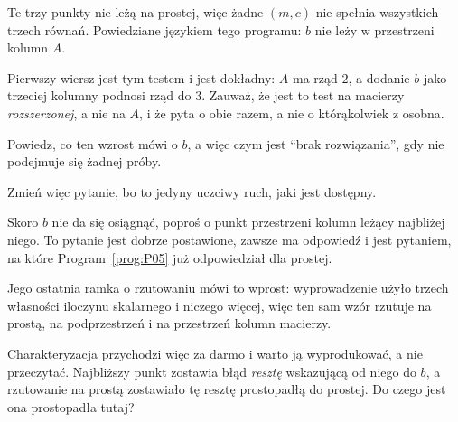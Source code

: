 \begin{fr}
Te trzy punkty nie leżą na prostej, więc żadne $(m, c)$ nie spełnia wszystkich
trzech równań. Powiedziane językiem tego programu: $b$ nie leży w przestrzeni
kolumn $A$.


Pierwszy wiersz jest tym testem i jest dokładny: $A$ ma rząd $2$, a dodanie $b$
jako trzeciej kolumny podnosi rząd do $3$. Zauważ, że jest to test na macierzy
\emph{rozszerzonej}, a nie na $A$, i że pyta o obie razem, a nie o którąkolwiek
z osobna.

Powiedz, co ten wzrost mówi o $b$, a więc czym jest \enquote{brak rozwiązania},
gdy nie podejmuje się żadnej próby.
\dotline
\nextframe
\end{fr}

\begin{fr}
Zmień więc pytanie, bo to jedyny uczciwy ruch, jaki jest dostępny.

Skoro $b$ nie da się osiągnąć, poproś o punkt przestrzeni kolumn leżący
najbliżej niego. To pytanie jest dobrze postawione, zawsze ma odpowiedź i jest
pytaniem, na które Program~\ref{prog:P05} już odpowiedział \dash{} dla prostej.

Jego ostatnia ramka o rzutowaniu mówi to wprost: wyprowadzenie użyło trzech
własności iloczynu skalarnego i niczego więcej, więc ten sam wzór rzutuje na
prostą, na podprzestrzeń i na przestrzeń kolumn macierzy.

Charakteryzacja przychodzi więc za darmo i warto ją wyprodukować, a nie
przeczytać. Najbliższy punkt zostawia błąd \dash{} \emph{resztę} \dash{}
wskazującą od niego do $b$, a rzutowanie na prostą zostawiało tę resztę
prostopadłą do prostej. Do czego jest ona prostopadła tutaj?
\dotline
\nextframe
\end{fr}

